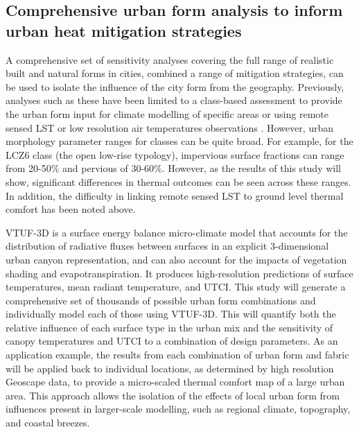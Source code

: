 \documentclass[final,3p,times,authoryear]{elsarticle}
\begin{document}
\subsection{Comprehensive urban form analysis to inform urban heat mitigation strategies}

A comprehensive set of sensitivity analyses covering the full range of realistic built and natural forms in cities, combined a range of mitigation strategies, can be used to isolate the influence of the city form from the geography. Previously, analyses such as these have been limited to a class-based assessment to provide the urban form input for climate modelling of specific areas \citep{stewart2014eval,Verdonck2018,Hammerberg2018,Masson2020,Emery2021} or using remote sensed LST \citep{Alexander2021,Li2022,Peng2022} or low resolution air temperatures observations \citep{Potgieter2021}. However, urban morphology parameter ranges for classes can be quite broad. For example, for the LCZ6 class (the open low-rise typology), impervious surface fractions can range from 20-50\% and pervious of 30-60\%. However, as the results of this study will show, significant differences in thermal outcomes can be seen across these ranges. In addition, the difficulty in linking remote sensed LST to ground level thermal comfort has been noted above.

VTUF-3D is a surface energy balance micro-climate model that accounts for the distribution of radiative fluxes between surfaces in an explicit 3-dimensional urban canyon representation, and can also account for the impacts of vegetation shading and evapotranspiration. It produces high-resolution predictions of surface temperatures, mean radiant temperature, and UTCI. This study will generate a comprehensive set of thousands of possible urban form combinations and individually model each of those using VTUF-3D. This will quantify both the relative influence of each surface type in the urban mix and the sensitivity of canopy temperatures and UTCI to a combination of design parameters. As an application example, the results from each combination of urban form and fabric will be applied back to individual locations, as determined by high resolution Geoscape data, to provide a micro-scaled thermal comfort map of a large urban area. This approach allows the isolation of the effects of local urban form from influences present in larger-scale modelling, such as regional climate, topography, and coastal breezes.
\end{document}
